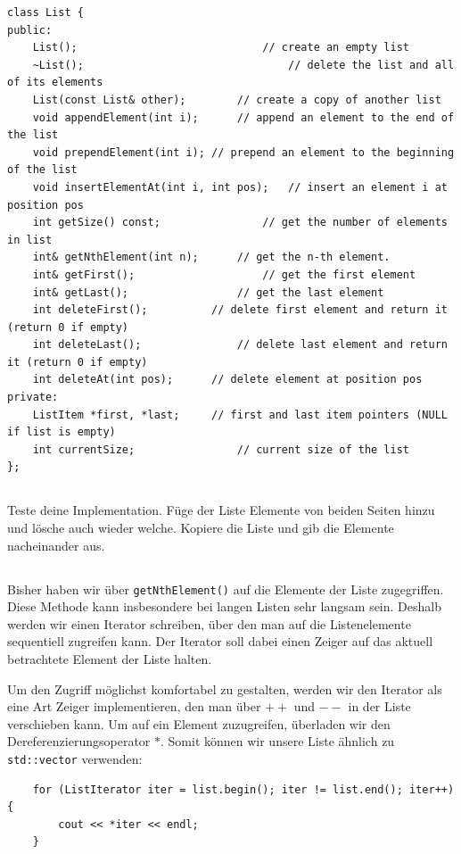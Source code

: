 \begin{lstlisting}
class List {
public:
	List();								// create an empty list
	~List();								// delete the list and all of its elements
	List(const List& other);		// create a copy of another list
	void appendElement(int i);		// append an element to the end of the list
	void prependElement(int i);	// prepend an element to the beginning of the list
	void insertElementAt(int i, int pos);	// insert an element i at position pos
	int getSize() const;				// get the number of elements in list
	int& getNthElement(int n);		// get the n-th element.
	int& getFirst();					// get the first element
	int& getLast();					// get the last element
	int deleteFirst();			// delete first element and return it (return 0 if empty)
	int deleteLast();				// delete last element and return it (return 0 if empty)
	int deleteAt(int pos);		// delete element at position pos
private:
	ListItem *first, *last;		// first and last item pointers (NULL if list is empty)
	int currentSize;				// current size of the list
};
\end{lstlisting}

\subsection{}
Teste deine Implementation.
Füge der Liste Elemente von beiden Seiten hinzu und lösche auch wieder welche.
Kopiere die Liste und gib die Elemente nacheinander aus.

\subsection{}
Bisher haben wir über \texttt{getNthElement()} auf die Elemente der Liste zugegriffen.
Diese Methode kann insbesondere bei langen Listen sehr langsam sein.
Deshalb werden wir einen Iterator schreiben, über den man auf die Listenelemente sequentiell zugreifen kann.
Der Iterator soll dabei einen Zeiger auf das aktuell betrachtete Element der Liste halten.

Um den Zugriff möglichst komfortabel zu gestalten, werden wir den Iterator als eine Art Zeiger implementieren, den man über \textbf{$++$} und \textbf{$--$} in der Liste verschieben kann.
Um auf ein Element zuzugreifen, überladen wir den Dereferenzierungsoperator $*$.
Somit können wir unsere Liste ähnlich zu \texttt{std::vector} verwenden:
\begin{lstlisting}
	for (ListIterator iter = list.begin(); iter != list.end(); iter++) {
		cout << *iter << endl;
	}
\end{lstlisting}

